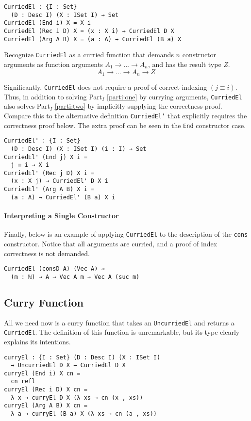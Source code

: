 \documentclass[preprint,nonatbib]{sigplanconf}
\newcommand{\refparti}[1]{Part$_I$ \ref{parti:#1}}
\begin{document}
\begin{verbatim}
CurriedEl : {I : Set}
  (D : Desc I) (X : ISet I) → Set
CurriedEl (End i) X = X i
CurriedEl (Rec i D) X = (x : X i) → CurriedEl D X
CurriedEl (Arg A B) X = (a : A) → CurriedEl (B a) X
\end{verbatim}

Recognize {\tt CurriedEl} as a curried function that demands
$n$ constructor arguments as function arguments
$A_1 → ... → A_n$, and has the result type $Z$.
\[
A_1 → ... → A_n → Z
\]

Significantly, {\tt CurriedEl} does not require a proof of correct
indexing $(j≡i)$. Thus, in addition to solving \refparti{one} by
currying arguments, {\tt CurriedEl} also solves \refparti{two} by
implicitly supplying the correctness proof. Compare this to the
alternative definition {\tt CurriedEl'} that explicitly requires the
correctness proof below. The extra proof can be seen in the
{\tt End} constructor case.

\begin{verbatim}
CurriedEl' : {I : Set}
  (D : Desc I) (X : ISet I) (i : I) → Set
CurriedEl' (End j) X i =
  j ≡ i → X i
CurriedEl' (Rec j D) X i =
  (x : X j) → CurriedEl' D X i
CurriedEl' (Arg A B) X i =
  (a : A) → CurriedEl' (B a) X i
\end{verbatim}

\paragraph{Interpreting a Single Constructor}

Finally, below is an example of applying {\tt CurriedEl} to the
description of the {\tt cons} constructor. Notice that all arguments
are curried, and a proof of index correctness is not demanded.

\begin{verbatim}
CurriedEl (consD A) (Vec A) ⇝
  (m : ℕ) → A → Vec A m → Vec A (suc m)
\end{verbatim}

\subsection{Curry Function}

All we need now is a curry function that takes an
{\tt UncurriedEl} and returns a {\tt CurriedEl}. The definition of
this function is unremarkable, but its type clearly explains its
intentions.

\begin{verbatim}
curryEl : {I : Set} (D : Desc I) (X : ISet I)
  → UncurriedEl D X → CurriedEl D X
curryEl (End i) X cn =
  cn refl
curryEl (Rec i D) X cn =
  λ x → curryEl D X (λ xs → cn (x , xs))
curryEl (Arg A B) X cn =
  λ a → curryEl (B a) X (λ xs → cn (a , xs))
\end{verbatim}
\end{document}
